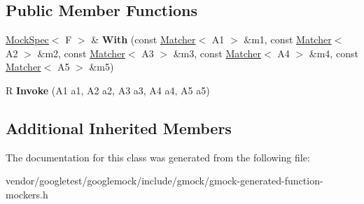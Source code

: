 \subsection*{Public Member Functions}
\begin{DoxyCompactItemize}
\item 
\mbox{\label{classtesting_1_1internal_1_1_function_mocker_3_01_r_07_a1_00_01_a2_00_01_a3_00_01_a4_00_01_a5_08_4_a719a0f9a249c92c3b990f5ea380899ff}} 
\hyperlink{classtesting_1_1internal_1_1_mock_spec}{Mock\+Spec}$<$ F $>$ \& {\bfseries With} (const \hyperlink{classtesting_1_1_matcher}{Matcher}$<$ A1 $>$ \&m1, const \hyperlink{classtesting_1_1_matcher}{Matcher}$<$ A2 $>$ \&m2, const \hyperlink{classtesting_1_1_matcher}{Matcher}$<$ A3 $>$ \&m3, const \hyperlink{classtesting_1_1_matcher}{Matcher}$<$ A4 $>$ \&m4, const \hyperlink{classtesting_1_1_matcher}{Matcher}$<$ A5 $>$ \&m5)
\item 
\mbox{\label{classtesting_1_1internal_1_1_function_mocker_3_01_r_07_a1_00_01_a2_00_01_a3_00_01_a4_00_01_a5_08_4_a481d6a28daaba552a9d36a9d67e4a3db}} 
R {\bfseries Invoke} (A1 a1, A2 a2, A3 a3, A4 a4, A5 a5)
\end{DoxyCompactItemize}
\subsection*{Additional Inherited Members}


The documentation for this class was generated from the following file\+:\begin{DoxyCompactItemize}
\item 
vendor/googletest/googlemock/include/gmock/gmock-\/generated-\/function-\/mockers.\+h\end{DoxyCompactItemize}

